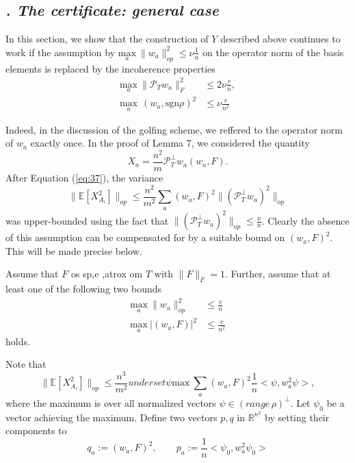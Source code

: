 \documentclass{article}
\begin{document}
\subsection{\textit{\uppercase\expandafter{}. The certificate: general case}}

In this section, we show that the construction of $Y$ described above continues to work if the assumption by $\underset{a} {\mathrm{max}} ~\|w_a\|_{op}^2 \le \nu \frac{1}{n}$ on the operator norm of the basis elements is replaced by the incoherence properties 
\begin{align*}
\underset{a} {\mathrm{max}} ~\|\mathcal{P}_Tw_a\|_F^2 &\le 2\nu \frac{r}{n},\\
\underset{a} {\mathrm{max}} ~~(w_a,\text{sgn}\rho)^2 &\le \nu\frac{r}{n^2}
\end{align*}

Indeed, in the discussion of the golfing scheme, we reffered to the operator norm of $w_a$ exactly once. In the proof of Lemma 7, we considered the quantity
\begin{equation}
X_a = \frac{n^2}{m}\mathcal{P}_T^\perp w_a(w_a, F).
\end{equation}
After Equation (\ref{eq:37}), the variance
\[
\|\mathbb{E}[X_{A_i}^2]\|_{op} \le \frac{n^2}{m^2}\sum_a(w_a,F)^2\|(\mathcal{P}_T^\perp w_a)^2\|_{op}
\]
was upper-bounded using the fact that $\|(\mathcal{P}_T^\perp w_a)^2\|_{op} \le \frac{\nu}{n}$. Clearly the absence of this assumption can be compensated for by a suitable bound on $(w_a,F)^2$. This will be made precise below.

Assume that $F$ os sp,e ,atrox om $T$ with $\|F\|_F = 1$. Further, assume that at least one of the following two bounds
\begin{align}
\underset{a} {\mathrm{max}} ~\|w_a\|_{op}^2 & \le \frac{v}{n}\\
\underset{a} {\mathrm{max}} ~|(w_a,F)|^2 & \le \frac{v}{n^2}
\end{align}
holds.

Note that
\begin{equation}
\|\mathbb{E}[X_{A_i}^2]\|_{op} \le \frac{n^3}{m^2}underset{\psi} {\mathrm{max}} ~\sum_a(w_a,F)^2\frac{1}{n}<\psi,w_a^2\psi>,
\label{eq:43}
\end{equation}
where the maximum is over all normalized vectors $\psi \in (range  \, \rho)^\perp$. Let $\psi_0$ be a vector achieving the maximum. Define two vectors $p,q$ in $\mathbb{R}^{n^2}$ by setting their components to 
\begin{equation}
q_a := (w_a,F)^2, \qquad p_a := \frac{1}{n}<\psi_0,w_a^2\psi_0>
\label{eq:44}
\end{equation}
\end{document}
